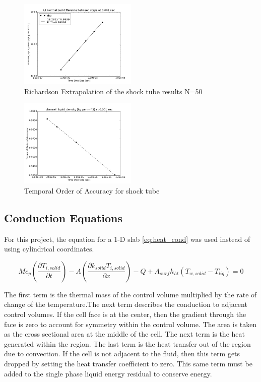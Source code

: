     \begin{figure}[!h]
    	\centering
    	\includegraphics[width=0.5\textwidth]{images/Shock_Tube/Difference_rho}
    	\caption{Richardson Extrapolation of the shock tube results N=50}
    	\label{fig:ST_Err_rho}
    \end{figure}
    
    \begin{figure}[!h]
    	\centering
    	\includegraphics[width=0.50\textwidth]{images/Shock_Tube/Temporal_Order_Of_Accuracy_rho}
    	\caption{Temporal Order of Accuracy for shock tube}
    	\label{fig:ST_OOA_rho}
    \end{figure}
	
	\clearpage
	\subsection{Conduction Equations} \label{Cond_Eqs}
	For this project, the equation for a 1-D slab \eqref{eq:heat_cond} was used
	instead of using cylindrical coordinates. 
	
	\begin{equation}
		M c_{p} \left( \frac{\partial T_{i,solid}}{\partial t} \right)
		- A \left( \frac{\partial k_{solid} T_{i,solid}}{\partial x}\right) 
		- Q 
		+ A_{surf} h_{ht} \left( T_{w,solid} - T_{liq}\right) 
		= 0
		\label{eq:heat_cond}
	\end{equation}
	
	The first term is the thermal mass of the control volume multiplied by the rate
	of change of the temperature.The next term describes the conduction to adjacent
	control volumes. If the cell face is at the center, then the gradient through
	the face is zero to account for symmetry within the control volume. The area is
	taken as the cross sectional area at the middle of the cell. The next term is
	the heat generated within the region. The last term is the heat transfer out of
	the region due to convection. If the cell is not adjacent to the fluid, then
	this term gets dropped by setting the heat transfer coefficient to zero. This
	same term must be added to the single phase liquid energy residual to conserve energy.
	
